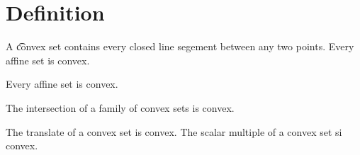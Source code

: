 
\section*{Definition}

A \t{convex set} contains every closed line segement between any two points.
Every affine set is convex.

\begin{proposition}
Every affine set is convex.
\end{proposition}

\begin{proposition}
The intersection of a family of convex sets is convex.
\end{proposition}

\begin{proposition}
The translate of a convex set is convex.
The scalar multiple of a convex set si convex.
\end{proposition}

\blankpage
